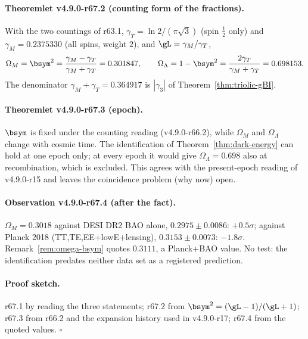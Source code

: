 \paragraph{Theoremlet v4.9.0-r67.2 (counting form of the fractions).}
With the two countings of r63.1, \(\gamma_T=\ln2/(\pi\sqrt3)\) (spin \(\tfrac12\) only) and \(\gamma_M=0.2375330\) (all spins, weight \(2\)), and
\(\gL=\gamma_M/\gamma_T\),
\[
\Omega_M=\bsym^2=\frac{\gamma_M-\gamma_T}{\gamma_M+\gamma_T}=0.301847,
\qquad
\Omega_\Lambda=1-\bsym^2=\frac{2\gamma_T}{\gamma_M+\gamma_T}=0.698153 .
\]
The denominator \(\gamma_M+\gamma_T=0.364917\) is \(|\gamma_3|\) of Theorem~\ref{thm:triolic-gBI}.

\paragraph{Theoremlet v4.9.0-r67.3 (epoch).}
\(\bsym\) is fixed under the counting reading (v4.9.0-r66.2), while \(\Omega_M\) and \(\Omega_\Lambda\) change with cosmic time.  The identification of
Theorem~\ref{thm:dark-energy} can hold at one epoch only; at every epoch it would give \(\Omega_\Lambda=0.698\) also at recombination, which is excluded.
This agrees with the present-epoch reading of v4.9.0-r15 and leaves the coincidence problem (why now) open.

\paragraph{Observation v4.9.0-r67.4 (after the fact).}
\(\Omega_M=0.3018\) against DESI DR2 BAO alone, \(0.2975\pm0.0086\): \(+0.5\sigma\); against Planck 2018 (TT,TE,EE+lowE+lensing), \(0.3153\pm0.0073\):
\(-1.8\sigma\).  Remark~\ref{rem:omega-bsym} quotes \(0.3111\), a Planck+BAO value.  No test: the identification predates neither data set as a registered
prediction.

\paragraph{Proof sketch.}
r67.1 by reading the three statements; r67.2 from \(\bsym^2=(\gL-1)/(\gL+1)\); r67.3 from r66.2 and the expansion history used in v4.9.0-r17; r67.4 from the
quoted values.  \(\square\)

